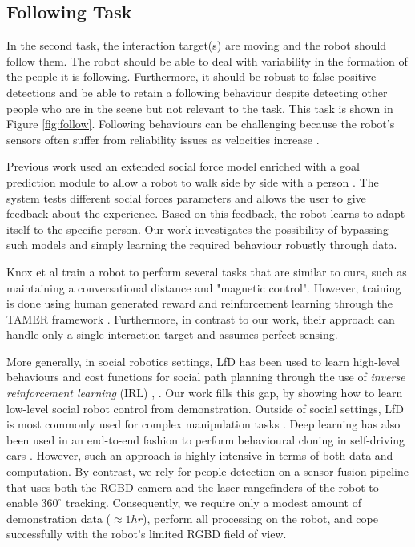 \documentclass[letterpaper, 10 pt, conference]{ieeeconf}
\begin{document}
\subsection{Following Task} 

In the second task, the interaction target(s) are moving and the robot should follow them. The robot should be able to deal with variability in the formation of the people it is following. Furthermore, it should be robust to false positive detections and be able to retain a following behaviour despite detecting other people who are in the scene but not relevant to the task. This task is shown in Figure \ref{fig:follow}. Following behaviours can be challenging because the robot's sensors often suffer from reliability issues as velocities increase \cite{kobilarov2006people}.

Previous work used an extended social force model enriched with a goal prediction module to allow a robot to walk side by side with a person \cite{ferrer2016robot}. The system tests different social forces parameters and allows the user to give feedback about the experience. Based on this feedback, the robot learns to adapt itself to the specific person.  Our work investigates the possibility of bypassing such models and simply learning the required behaviour robustly through data.  

Knox et al \cite{knox2013training} train a robot to perform several tasks that are similar to ours, such as maintaining a conversational distance and "magnetic control". However, training is done using human generated reward and reinforcement learning through the TAMER framework \cite{knox2009interactively}. Furthermore, in contrast to our work, their approach can handle only a single interaction target and assumes perfect sensing.

More generally, in social robotics settings, LfD has been used to learn high-level behaviours \cite{louie2016learning,lockerd2004tutelage} and cost functions for social path planning through the use of \emph{inverse reinforcement learning} (IRL) \cite{abbeel2004apprenticeship}, \cite{henry2010learning}. Our work fills this gap, by showing how to learn low-level social robot control from demonstration. Outside of social settings, LfD is most commonly used for complex manipulation tasks \cite{argall2009survey}. Deep learning has also been used in an end-to-end fashion to perform behavioural cloning in self-driving cars \cite{bojarski2016end}. However, such an approach is highly intensive in terms of both data and computation.  By contrast, we rely for people detection on a sensor fusion pipeline that uses both the RGBD camera and the laser rangefinders of the robot to enable $360^\circ$ tracking.  Consequently, we require only a modest amount of demonstration data ($\approx 1hr$), perform all processing on the robot, and cope successfully with the robot's limited RGBD field of view.
\end{document}
